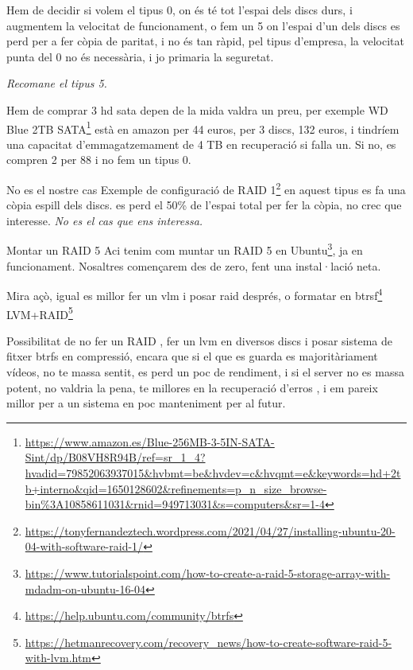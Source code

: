 \documentclass[
  10pt,
]{krantz}
\DeclareRobustCommand{\href}[2]{#2\footnote{\url{#1}}}
\begin{document}
Hem de decidir si volem el tipus 0, on és té tot l'espai dels discs durs, i augmentem la velocitat de funcionament, o fem un 5 on l'espai d'un dels discs es perd per a fer còpia de paritat, i no és tan ràpid, pel tipus d'empresa, la velocitat punta del 0 no és necessària, i jo primaria la seguretat.

\emph{Recomane el tipus 5.}

Hem de comprar 3 hd sata depen de la mida valdra un preu, per exemple \href{https://www.amazon.es/Blue-256MB-3-5IN-SATA-Sint/dp/B08VH8R94B/ref=sr_1_4?hvadid=79852063937015\&hvbmt=be\&hvdev=c\&hvqmt=e\&keywords=hd+2tb+interno\&qid=1650128602\&refinements=p_n_size_browse-bin\%3A10858611031\&rnid=949713031\&s=computers\&sr=1-4}{WD Blue 2TB SATA} està en amazon per 44 euros, per 3 discs, 132 euros, i tindríem una capacitat d'emmagatzemament de 4 TB en recuperació si falla un. Si no, es compren 2 per 88 i no fem un tipus 0.

\begin{rmdnote}{No es el nostre cas}
Exemple de configuració de \href{https://tonyfernandeztech.wordpress.com/2021/04/27/installing-ubuntu-20-04-with-software-raid-1/}{RAID 1} en aquest tipus es fa una còpia espill dels discs. es perd el 50\% de l'espai total per fer la còpia, no crec que interesse. \emph{No es el cas que ens interessa.}

\end{rmdnote}

\begin{rmdinfo}{Montar un RAID 5}
Aci tenim com muntar un \href{https://www.tutorialspoint.com/how-to-create-a-raid-5-storage-array-with-mdadm-on-ubuntu-16-04}{RAID 5 en Ubuntu}, ja en funcionament. Nosaltres començarem des de zero, fent una instal·lació neta.

\end{rmdinfo}

Mira açò, igual es millor fer un vlm i posar raid després, o formatar en \href{https://help.ubuntu.com/community/btrfs}{btrsf} \href{https://hetmanrecovery.com/recovery_news/how-to-create-software-raid-5-with-lvm.htm}{LVM+RAID}

Possibilitat de no fer un RAID , fer un lvm en diversos discs i posar sistema de fitxer btrfs en compressió, encara que si el que es guarda es majoritàriament vídeos, no te massa sentit, es perd un poc de rendiment, i si el server no es massa potent, no valdria la pena, te millores en la recuperació d'erros , i em pareix millor per a un sistema en poc manteniment per al futur.
\end{document}

